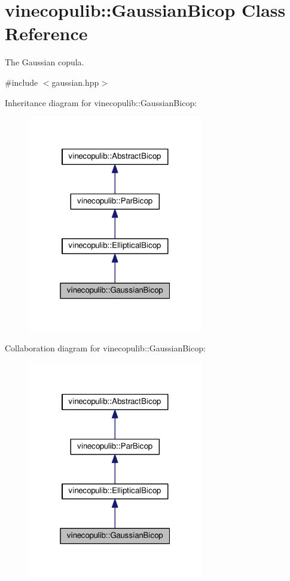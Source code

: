 \hypertarget{classvinecopulib_1_1_gaussian_bicop}{}\section{vinecopulib\+:\+:Gaussian\+Bicop Class Reference}
\label{classvinecopulib_1_1_gaussian_bicop}


The Gaussian copula.  




{\ttfamily \#include $<$gaussian.\+hpp$>$}



Inheritance diagram for vinecopulib\+:\+:Gaussian\+Bicop\+:
\nopagebreak
\begin{figure}[H]
\begin{center}
\leavevmode
\includegraphics[width=217pt]{classvinecopulib_1_1_gaussian_bicop__inherit__graph}
\end{center}
\end{figure}


Collaboration diagram for vinecopulib\+:\+:Gaussian\+Bicop\+:
\nopagebreak
\begin{figure}[H]
\begin{center}
\leavevmode
\includegraphics[width=217pt]{classvinecopulib_1_1_gaussian_bicop__coll__graph}
\end{center}
\end{figure}
